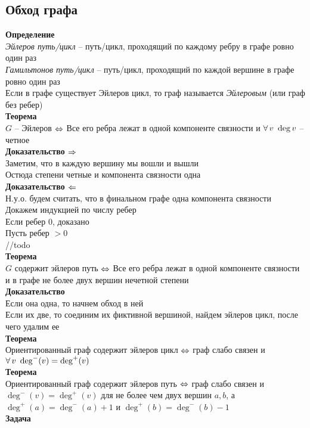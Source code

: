 \documentclass[12pt]{article}
\begin{document}
\subsection{Обход графа}
\textbf{Определение}\\
\textit{Эйлеров путь/цикл} -- путь/цикл, проходящий по каждому ребру в графе ровно один раз\\
\textit{Гамильтонов путь/цикл} -- путь/цикл, проходящий по каждой вершине в графе ровно один раз\\
Если в графе существует Эйлеров цикл, то граф называется \textit{Эйлеровым} (или граф без ребер)\\
\textbf{Теорема}\\
$G$ -- Эйлеров $\Leftrightarrow$ Все его ребра лежат в одной компоненте связности и $\forall\, v\ \deg v$ -- четное\\
\textbf{Доказательство $\Rightarrow$}\\
Заметим, что в каждую вершину мы вошли и вышли\\
Остюда степени четные и компонента связности одна\\
\textbf{Доказательство $\Leftarrow$}\\
Н.у.о. будем считать, что в финальном графе одна компонента связности\\
Докажем индукцией по числу ребер\\
Если ребер 0, доказано\\
Пусть ребер $> 0$\\
//todo\\
\textbf{Теорема}\\
$G$ содержит эйлеров путь $\Leftrightarrow$ Все его ребра лежат в одной компоненте связности и в графе не более двух вершин нечетной степени\\
\textbf{Доказательство}\\
Если она одна, то начнем обход в ней\\
Если их две, то соединим их фиктивной вершиной, найдем эйлеров цикл, после чего удалим ее\\
\textbf{Теорема}\\
Ориентированный граф содержит эйлеров цикл $\Leftrightarrow$ граф слабо связен и $\forall\, v\ \deg^-(v)=\deg^+(v)$\\
\textbf{Теорема}\\
Ориентированный граф содержит эйлеров путь $\Leftrightarrow$ граф слабо связен и $\deg^-(v)=\deg^+(v)$ для не более чем двух вершин $a, b$, а $\deg^+(a) = \deg^-(a) + 1$ и $\deg^+(b) = \deg^-(b) - 1$\\
\textbf{Задача}\\
\end{document}
